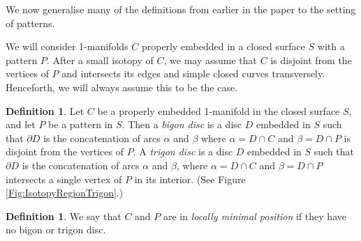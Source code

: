 \documentclass[oneside]{amsart}
\numberwithin{equation}{section}
\theoremstyle{plain}
\theoremstyle{definition}
\newtheorem{definition}[equation]{Definition}
\newcommand{\cut}{\backslash\backslash}
\begin{document}
We now generalise many of the definitions from earlier in the paper to the setting of patterns.

We will consider 1-manifolds $C$ properly embedded in a closed surface $S$ with a pattern $P$. After a small isotopy of $C$, we may assume that $C$ is disjoint from the vertices of $P$ and intersects its edges and simple closed curves transversely. Henceforth, we will always assume this to be the case.


\begin{definition}
Let $C$ be a properly embedded 1-manifold in the closed surface $S$, and let $P$ be a pattern in $S$. Then a \emph{bigon disc} is a disc $D$ embedded in $S$ such that $\partial D$ is the concatenation of arcs $\alpha$ and $\beta$ where $\alpha = D \cap C$ and $\beta = D \cap P$ is disjoint from the vertices of $P$. 
A \emph{trigon disc} is a disc $D$ embedded in $S$ such that $\partial D$ is the concatenation of arcs $\alpha$ and $\beta$, where $\alpha = D \cap C$ and $\beta = D \cap P$ intersects a single vertex of $P$ in its interior. (See Figure \ref{Fig:IsotopyRegionTrigon}.)
\end{definition}

\begin{definition}
We say that $C$ and $P$ are in \emph{locally minimal position} if they have no bigon or trigon disc.
\end{definition}


\end{document}
